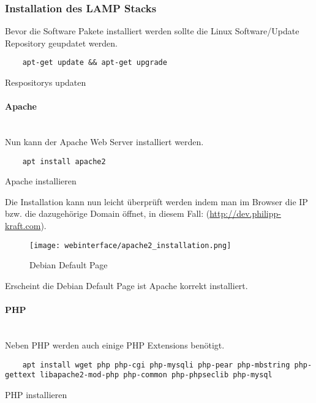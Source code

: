 \subsubsection{Installation des LAMP Stacks}
Bevor die Software Pakete installiert werden sollte die Linux Software/Update
Repository geupdatet werden.

\begin{listing}[H]
  \begin{verbatim}
    apt-get update && apt-get upgrade
  \end{verbatim}
  \caption{Respositorys updaten}
\end{listing}

\paragraph{Apache}\mbox{}\\

Nun kann der Apache Web Server installiert werden.

\begin{listing}[H]
  \begin{verbatim}
    apt install apache2
  \end{verbatim}
  \caption{Apache installieren}
\end{listing}

Die Installation kann nun leicht überprüft werden indem man im Browser die IP
bzw. die dazugehörige Domain öffnet, in diesem Fall:
(\url{http://dev.philipp-kraft.com}).

\begin{figure}[H]
  \centering
  \texttt{[image: webinterface/apache2\_installation.png]}
  \caption{Debian Default Page}
\end{figure}

Erscheint die Debian Default Page ist Apache korrekt installiert.

\paragraph{PHP}\mbox{}\\
Neben PHP werden auch einige PHP Extensions benötigt.

\begin{listing}[H]
  \begin{verbatim}
    apt install wget php php-cgi php-mysqli php-pear php-mbstring php-gettext libapache2-mod-php php-common php-phpseclib php-mysql
  \end{verbatim}
  \caption{PHP installieren}
\end{listing}

